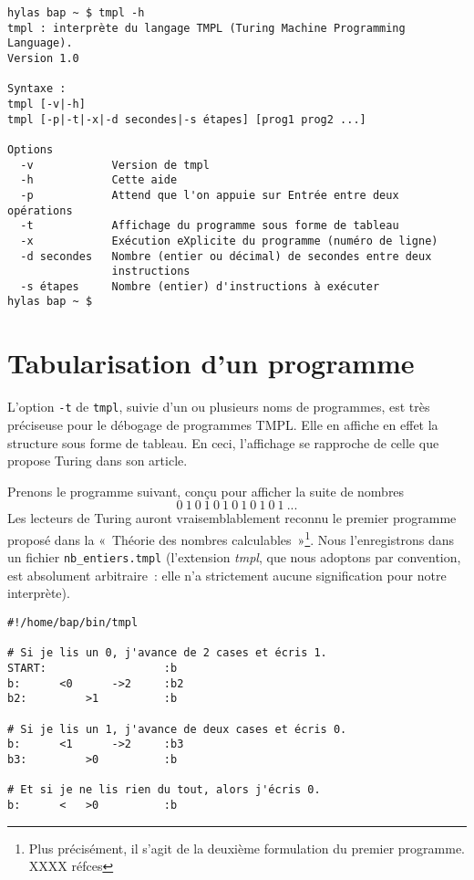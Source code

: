 \documentclass[a4paper, 11pt]{report}
\begin{document}
\begin{verbatim}
hylas bap ~ $ tmpl -h
tmpl : interprète du langage TMPL (Turing Machine Programming Language).
Version 1.0

Syntaxe :
tmpl [-v|-h]
tmpl [-p|-t|-x|-d secondes|-s étapes] [prog1 prog2 ...]

Options
  -v            Version de tmpl
  -h            Cette aide
  -p            Attend que l'on appuie sur Entrée entre deux opérations
  -t            Affichage du programme sous forme de tableau
  -x            Exécution eXplicite du programme (numéro de ligne)
  -d secondes   Nombre (entier ou décimal) de secondes entre deux
                instructions
  -s étapes     Nombre (entier) d'instructions à exécuter
hylas bap ~ $
\end{verbatim}



\section{Tabularisation d'un programme}

L'option \texttt{-t} de \texttt{tmpl}, suivie d'un ou plusieurs noms de
programmes, est très préciseuse pour le débogage de programmes
TMPL. Elle en affiche en effet la structure sous forme de tableau. En
ceci, l'affichage se rapproche de celle que propose Turing dans son
article. 

\par

Prenons le programme suivant, conçu pour afficher la suite de
nombres $$0\ 1\ 0\ 1\ 0\ 1\ 0\ 1\ 0\ 1\ 0\ 1\ ...$$ Les lecteurs de
Turing auront vraisemblablement reconnu le premier programme proposé
dans la «~Théorie des nombres calculables~»\footnote{Plus précisément,
  il s'agit de la deuxième formulation du premier programme. XXXX
  réfces}. Nous l'enregistrons dans un fichier \texttt{nb\_entiers.tmpl}
(l'extension \emph{tmpl}, que nous adoptons par convention, est
absolument arbitraire~: elle n'a strictement aucune signification pour
notre interprète).

\begin{verbatim}
#!/home/bap/bin/tmpl

# Si je lis un 0, j'avance de 2 cases et écris 1.
START:                  :b
b:      <0      ->2     :b2
b2:         >1          :b

# Si je lis un 1, j'avance de deux cases et écris 0.
b:      <1      ->2     :b3
b3:         >0          :b

# Et si je ne lis rien du tout, alors j'écris 0.
b:      <   >0          :b
\end{verbatim}
\end{document}
